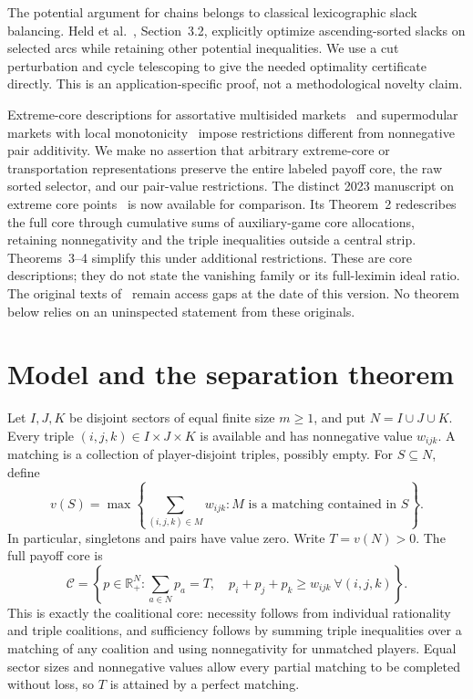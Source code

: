 \documentclass[11pt]{article}
\theoremstyle{remark}\newtheorem{remark}[theorem]{Remark}
\newcommand{\core}{\mathcal C}
\newcommand{\R}{\mathbb R}
\begin{document}
The potential argument for chains belongs to classical lexicographic
slack balancing. Held et al.~\cite{Held2003}, Section~3.2, explicitly
optimize ascending-sorted slacks on selected arcs while retaining other
potential inequalities. We use a cut perturbation and cycle telescoping
to give the needed optimality certificate directly. This is an
application-specific proof, not a methodological novelty claim.

Extreme-core descriptions for assortative multisided
markets~\cite{Martinez2020} and supermodular markets with local
monotonicity~\cite{Martinez2026} impose restrictions different from
nonnegative pair additivity. We make no assertion that arbitrary extreme-core
or transportation representations preserve the entire labeled payoff core,
the raw sorted selector, and our pair-value restrictions. The distinct
2023 manuscript on extreme core points~\cite{Martinez2023} is now available
for comparison. Its Theorem~2 redescribes the full core through cumulative
sums of auxiliary-game core allocations, retaining nonnegativity and the
triple inequalities outside a central strip. Theorems~3--4 simplify this
under additional restrictions. These are core descriptions; they do not
state the vanishing family or its full-leximin ideal ratio. The original
texts of~\cite{Quint1991,Lucas1995,Stuart1997} remain access gaps at the
date of this version. No theorem below relies on an uninspected statement
from these originals.

\section{Model and the separation theorem}
Let $I,J,K$ be disjoint sectors of equal finite size $m\geq1$, and put
$N=I\cup J\cup K$. Every triple $(i,j,k)\in I\times J\times K$ is
available and has nonnegative value $w_{ijk}$. A matching is a collection of
player-disjoint triples, possibly empty. For $S\subseteq N$, define
\[
 v(S)=\max\left\{\sum_{(i,j,k)\in M}w_{ijk}:
       M\text{ is a matching contained in }S\right\}.
\]
In particular, singletons and pairs have value zero. Write $T=v(N)>0$.
The full payoff core is
\begin{equation}\label{eq:core}
 \core=\left\{p\in\R_+^N:\sum_{a\in N}p_a=T,
                \quad p_i+p_j+p_k\geq w_{ijk}
                \ \forall(i,j,k)\right\}.
\end{equation}
This is exactly the coalitional core: necessity follows from individual
rationality and triple coalitions, and sufficiency follows by summing
triple inequalities over a matching of any coalition and using
nonnegativity for unmatched players. Equal sector sizes and nonnegative
values allow every partial matching to be completed without loss, so
$T$ is attained by a perfect matching.
\end{document}

